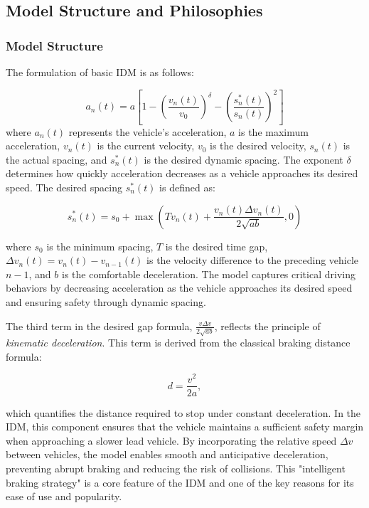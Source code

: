 \documentclass[a4paper,fleqn]{cas-sc}
\begin{document}
\subsection{Model Structure and Philosophies}

\subsubsection{Model Structure}

The formulation of basic IDM is as follows:

\begin{equation}
a_n(t) = a \left[ 1 - \left( \frac{v_n(t)}{v_0} \right)^{\delta }- \left( \frac{s^*_n(t)}{s_n(t)} \right)^2 \right]
\label{equ:IDM1}
\end{equation}
where $ a_n(t) $ represents the vehicle's acceleration, $ a $ is the maximum acceleration, $ v_n(t) $ is the current velocity, $ v_0 $ is the desired velocity, $ s_n(t) $ is the actual spacing, and $ s^*_n(t) $ is the desired dynamic spacing. {The exponent $\delta$ determines  how quickly acceleration decreases as a vehicle approaches its desired speed.} The desired spacing $ s^*_n(t) $ is defined as:

\begin{equation}
s^*_n(t) = s_0 + \max \left( T v_n(t) + \frac{v_n(t) \Delta v_n(t)}{2\sqrt{ab}}, 0 \right)
\label{equ:IDM2}
\end{equation}

where $ s_0 $ is the minimum spacing, $ T $ is the desired time gap, $ \Delta v_n(t) = v_n(t) - v_{n-1}(t) $ is the velocity difference to the preceding vehicle $n-1$, and $ b $ is the comfortable deceleration. The model captures critical driving behaviors by decreasing acceleration as the vehicle approaches its desired speed and ensuring safety through dynamic spacing. 

The third term in the desired gap formula, $\frac{v \Delta v}{2\sqrt{ab}}$, reflects the principle of \textit{kinematic deceleration}. This term is derived from the classical braking distance formula:

\begin{equation}
d = \frac{v^2}{2a},
\end{equation}

which quantifies the distance required to stop under constant deceleration. In the IDM, this component ensures that the vehicle maintains a sufficient safety margin when approaching a slower lead vehicle. By incorporating the relative speed $\Delta v$ between vehicles, the model enables smooth and anticipative deceleration, preventing abrupt braking and reducing the risk of collisions. This "intelligent braking strategy" is a core feature of the IDM and one of the key reasons for its ease of use and popularity.
\end{document}
